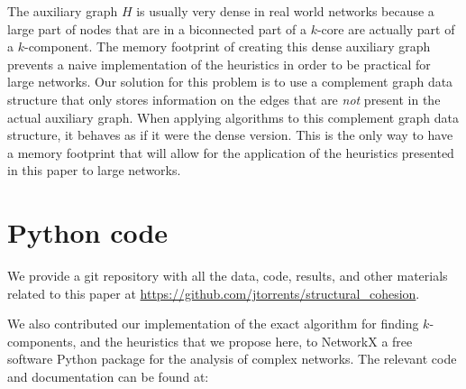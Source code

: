 The auxiliary graph $H$ is usually very dense in real world networks because a large part of nodes that are in a biconnected part of a $k$-core are actually part of a $k$-component. The memory footprint of creating this dense auxiliary graph prevents a naive implementation of the heuristics in order to be practical for large networks. Our solution for this problem is to use a complement graph data structure that only stores information on the edges that are \emph{not} present in the actual auxiliary graph. When applying algorithms to this complement graph data structure, it behaves as if it were the dense version. This is the only way to have a memory footprint that will allow for the application of the heuristics presented in this paper to large networks.

\newpage

\section{Python code}
\label{code}

We provide a git repository with all the data, code, results, and other materials related to this paper at \href{https://github.com/jtorrents/structural_cohesion}{https://github.com/jtorrents/structural\_cohesion}.

We also contributed our implementation of the exact algorithm for finding $k$-components, and the heuristics that we propose here, to NetworkX a free software Python package for the analysis of complex networks. The relevant code and documentation can be found at:

